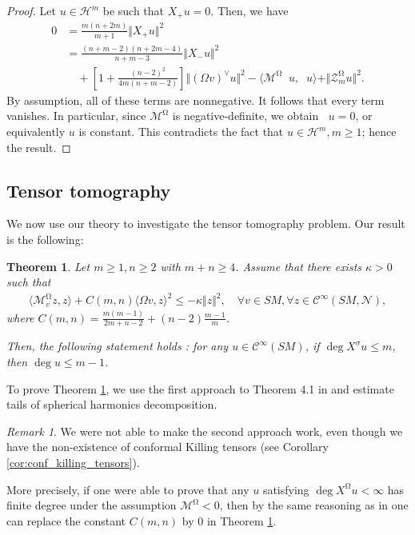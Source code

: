 \documentclass[12pt]{amsart}
\numberwithin{numbering}{section}
\theoremstyle{plain}
\newtheorem{thm}[numbering]{Theorem}
\theoremstyle{definition}
\theoremstyle{remark}
\newtheorem{rmq}[numbering]{Remark}
\numberwithin{equation}{section}
\DeclareMathOperator{\nv}{\nabla_{\mathbb{V}}}
\DeclareMathOperator{\mg}{\Omega}
\begin{document}
\begin{proof}
Let $u \in \mathcal{H}^m$ be such that $X_+ u = 0$. Then, we have 
\begin{align*}
0 &= \frac{m(n+2m)}{m+1} \Vert X_+ u \Vert^2 \\
&= \frac{(n+m-2)(n+2m-4)}{n+m-3} \Vert X_- u \Vert^2 \\
&\quad + \left [1 + \frac{(n-2)^2}{4m(n+m-2)} \right ] \Vert (\Omega v)^\vee u \Vert^2 - \langle \mathcal{M}^{\mg} \nv u, \nv u \rangle + \Vert \mathcal{Z}_m^{\mg} u \Vert^2.
\end{align*} 
By assumption, all of these terms are nonnegative. It follows that every term vanishes. In particular, since $\mathcal{M}^{\mg}$ is negative-definite, we obtain $\nv u = 0$, or equivalently $u$ is constant. This contradicts the fact that $u \in \mathcal{H}^m, m \geq 1$; hence the result.
\end{proof}

\subsection{Tensor tomography} \label{sec:tensor_tomo}

We now use our theory to investigate the tensor tomography problem. Our result is the following:

\begin{thm} \label{thm:tomo}
Let $m \geq 1, n \geq 2$ with $m + n \geq 4$.  Assume that there exists $\kappa > 0$ such that 
\begin{align*}
\langle \mathcal{M}^{\mg}_v z, z \rangle + C(m, n) \langle \Omega v, z \rangle^2 \leq - \kappa \Vert z \Vert^2, \quad \forall v \in SM, \forall z \in \mathcal{C}^\infty(SM, \mathcal{N}),
\end{align*}
where $C(m, n) = \frac{m(m-1)}{2m+n-2} + (n-2) \frac{m-1}{m}$. 

Then, the following statement holds : for any $u \in \mathcal{C}^\infty(SM)$, if $\deg X^\sigma u \leq m$, then $\deg u \leq m - 1$. 
\end{thm}

To prove Theorem \ref{thm:tomo}, we use the first approach to Theorem 4.1 in \cite{guillarmou2016xray} and estimate tails of spherical harmonics decomposition. 

\begin{rmq}
We were not able to make the second approach work, even though we have the non-existence of conformal Killing tensors (see Corollary \ref{cor:conf_killing_tensors}). 

More precisely, if one were able to prove that any $u$ satisfying $\deg X^{\mg} u < \infty$ has finite degree under the assumption $\mathcal{M}^{\mg} < 0$, then by the same reasoning as in \cite{guillarmou2016xray} one can replace the constant $C(m, n)$ by $0$ in Theorem \ref{thm:tomo}.
\end{rmq}
\end{document}
